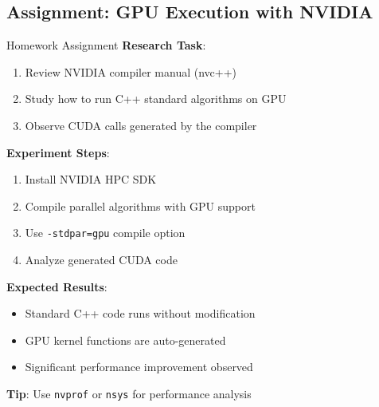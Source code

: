 \subsection{Assignment: GPU Execution with NVIDIA}
\begin{frame}{Homework Assignment}
    \textbf{Research Task}:
    \begin{enumerate}
        \item Review NVIDIA compiler manual (nvc++)
        \item Study how to run C++ standard algorithms on GPU
        \item Observe CUDA calls generated by the compiler
    \end{enumerate}

    \vspace{1em}
    \textbf{Experiment Steps}:
    \begin{enumerate}
        \item Install NVIDIA HPC SDK
        \item Compile parallel algorithms with GPU support
        \item Use \texttt{-stdpar=gpu} compile option
        \item Analyze generated CUDA code
    \end{enumerate}

    \vspace{1em}
    \textbf{Expected Results}:
    \begin{itemize}
        \item Standard C++ code runs without modification
        \item GPU kernel functions are auto-generated
        \item Significant performance improvement observed
    \end{itemize}

    \vspace{0.5em}
    \textbf{Tip}: Use \texttt{nvprof} or \texttt{nsys} for performance analysis
\end{frame}

